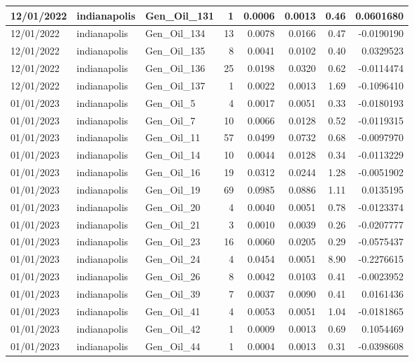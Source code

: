 \documentclass[
  letterpaper,
  DIV=11,
  numbers=noendperiod]{scrartcl}
\begin{document}
\begin{tabular}{l|l|l|r|r|r|r|r}
\hline
12/01/2022 & indianapolis & Gen\_Oil\_131 & 1 & 0.0006 & 0.0013 & 0.46 & 0.0601680\\
\hline
12/01/2022 & indianapolis & Gen\_Oil\_134 & 13 & 0.0078 & 0.0166 & 0.47 & -0.0190190\\
\hline
12/01/2022 & indianapolis & Gen\_Oil\_135 & 8 & 0.0041 & 0.0102 & 0.40 & 0.0329523\\
\hline
12/01/2022 & indianapolis & Gen\_Oil\_136 & 25 & 0.0198 & 0.0320 & 0.62 & -0.0114474\\
\hline
12/01/2022 & indianapolis & Gen\_Oil\_137 & 1 & 0.0022 & 0.0013 & 1.69 & -0.1096410\\
\hline
01/01/2023 & indianapolis & Gen\_Oil\_5 & 4 & 0.0017 & 0.0051 & 0.33 & -0.0180193\\
\hline
01/01/2023 & indianapolis & Gen\_Oil\_7 & 10 & 0.0066 & 0.0128 & 0.52 & -0.0119315\\
\hline
01/01/2023 & indianapolis & Gen\_Oil\_11 & 57 & 0.0499 & 0.0732 & 0.68 & -0.0097970\\
\hline
01/01/2023 & indianapolis & Gen\_Oil\_14 & 10 & 0.0044 & 0.0128 & 0.34 & -0.0113229\\
\hline
01/01/2023 & indianapolis & Gen\_Oil\_16 & 19 & 0.0312 & 0.0244 & 1.28 & -0.0051902\\
\hline
01/01/2023 & indianapolis & Gen\_Oil\_19 & 69 & 0.0985 & 0.0886 & 1.11 & 0.0135195\\
\hline
01/01/2023 & indianapolis & Gen\_Oil\_20 & 4 & 0.0040 & 0.0051 & 0.78 & -0.0123374\\
\hline
01/01/2023 & indianapolis & Gen\_Oil\_21 & 3 & 0.0010 & 0.0039 & 0.26 & -0.0207777\\
\hline
01/01/2023 & indianapolis & Gen\_Oil\_23 & 16 & 0.0060 & 0.0205 & 0.29 & -0.0575437\\
\hline
01/01/2023 & indianapolis & Gen\_Oil\_24 & 4 & 0.0454 & 0.0051 & 8.90 & -0.2276615\\
\hline
01/01/2023 & indianapolis & Gen\_Oil\_26 & 8 & 0.0042 & 0.0103 & 0.41 & -0.0023952\\
\hline
01/01/2023 & indianapolis & Gen\_Oil\_39 & 7 & 0.0037 & 0.0090 & 0.41 & 0.0161436\\
\hline
01/01/2023 & indianapolis & Gen\_Oil\_41 & 4 & 0.0053 & 0.0051 & 1.04 & -0.0181865\\
\hline
01/01/2023 & indianapolis & Gen\_Oil\_42 & 1 & 0.0009 & 0.0013 & 0.69 & 0.1054469\\
\hline
01/01/2023 & indianapolis & Gen\_Oil\_44 & 1 & 0.0004 & 0.0013 & 0.31 & -0.0398608\\

\end{tabular}
\end{document}
